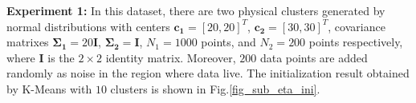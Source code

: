 \documentclass[conference]{IEEEtran}
\theoremstyle{definition}
\begin{document}
\textbf{Experiment 1:} In this dataset, there are two physical clusters generated by normal distributions with centers $\mathbf{c_1}=[20, 20]^T$, $\mathbf{c_2}=[30, 30]^T$, covariance matrixes $\mathbf{\Sigma_1}=20\mathbf{I}$, $\mathbf{\Sigma_2}=\mathbf{I}$, $N_1=1000$ points, and $N_2=200$ points  respectively, where $\mathbf{I}$ is the $2\times 2$ identity matrix. Moreover, $200$ data points are added randomly as noise in the region where data live.
The initialization result obtained by K-Means with $10$ clusters is shown in Fig.\ref{fig_sub_eta_ini}.
\begin{figure}[tb]
\captionsetup[subfloat]{farskip=1pt,captionskip=1pt}%
   \centering
   \quad
    \\

\end{figure}
\end{document}
